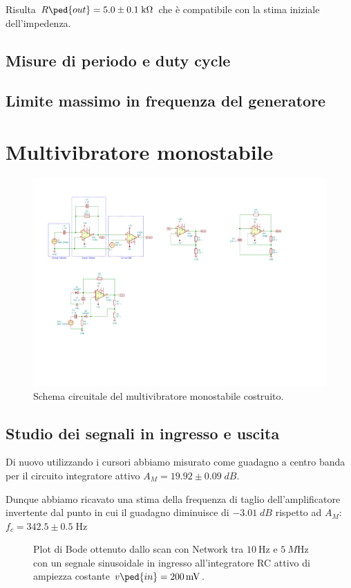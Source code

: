 \documentclass[10pt,a4paper]{article}
\begin{document}
Risulta $R\ped{out} = 5.0 \pm 0.1\; \si{k\ohm}$ che è compatibile con la stima 
iniziale dell'impedenza.

\subsection{Misure di periodo e duty cycle}

\subsection{Limite massimo in frequenza del generatore}

\section{Multivibratore monostabile}
\begin{figure}[htbp]
    \centering
	\includegraphics[scale=1.2]{monostable}
    \caption{Schema circuitale del multivibratore monostabile costruito.
    \label{fig: monostableschm}}
\end{figure}

\subsection{Studio dei segnali in ingresso e uscita}
Di nuovo utilizzando i cursori abbiamo misurato come guadagno a centro banda
per il circuito integratore attivo $A_M = 19.92 \pm 0.09 \; \si{dB}$.

Dunque abbiamo ricavato una stima della frequenza di taglio dell'amplificatore
invertente dal punto in cui il guadagno diminuisce di $-3.01 \; \si{dB}$
rispetto ad $A_M$:
$f_c = 342.5 \pm 0.5 \; \si{\Hz}$
\begin{figure}[htbp]
\centering
\caption{Plot di Bode ottenuto dallo scan con Network tra $\SI{10}{\Hz}$ e
$\SI{5}{M\Hz}$ con un segnale sinusoidale in ingresso all'integratore RC
attivo di ampiezza costante $v\ped{in} = \SI{200}{m\V}$.
\label{fig: intbode}}
\end{figure}
\end{document}
